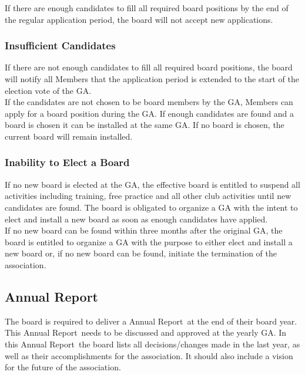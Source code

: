 \documentclass[a4paper]{article}
\newcommand{\Ajv}{Annual Report} %
\begin{document}
If there are enough candidates to fill all required board positions by the end of the regular application period, the board will not accept new applications. \\

\subsubsection{Insufficient Candidates}

If there are not enough candidates to fill all required board positions, the board will notify all Members that the application period is extended to the start of the election vote of the GA. \\

If the candidates are not chosen to be board members by the GA, Members can apply for a board position during the GA. If enough candidates are found and a board is chosen it can be installed at the same GA. If no board is chosen, the current board will remain installed.

\subsubsection{Inability to Elect a Board}

If no new board is elected at the GA, the effective board is entitled to suspend all activities including training, free practice and all other club activities until new candidates are found. The board is obligated to organize a GA with the intent to elect and install a new board as soon as enough candidates have applied. \\

If no new board can be found within three months after the original GA, the board is entitled to organize a GA with the purpose to either elect and install a new board or, if no new board can be found, initiate the termination of the association.

\subsection{\Ajv}
The board is required to deliver a \Ajv\ at the end of their board year. This \Ajv\ needs to be discussed and approved at the yearly GA. In this \Ajv\ the board lists all decisions/changes made in the last year, as well as their accomplishments for the association. It should also include a vision for the future of the association.

\pagebreak
\end{document}
